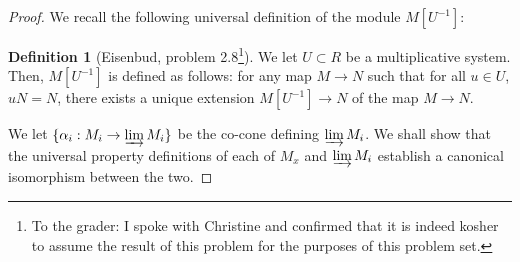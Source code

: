 \documentclass[english]{article}
\theoremstyle{remark}
\theoremstyle{definition}
\newtheorem{definition}[theorem]{Definition}
\newcommand{\colim}{\varinjlim}
\begin{document}
\begin{proof}
We recall the following universal definition of the module $M[U^{-1}]$:\begin{definition}[Eisenbud, problem 2.8\footnote{To the grader: I spoke with Christine and confirmed that it is indeed kosher to assume the result of this problem for the purposes of this problem set.}]\label{defmodloc}
	We let $U\subset R$ be a multiplicative system. Then, $M[U^{-1}]$ is defined as follows: for any map $M\to N$ such that for all $u\in U$, $uN=N$, there exists a unique extension $M[U^{-1}]\to N$ of the map $M\to N$.
\end{definition} We let $\{\alpha_i:M_i\to \colim M_i\}$ be the co-cone defining $\colim M_i$. We shall show that the universal property definitions of each of $M_x$ and $\colim M_i$ establish a canonical isomorphism between the two.


\end{proof}
\end{document}
